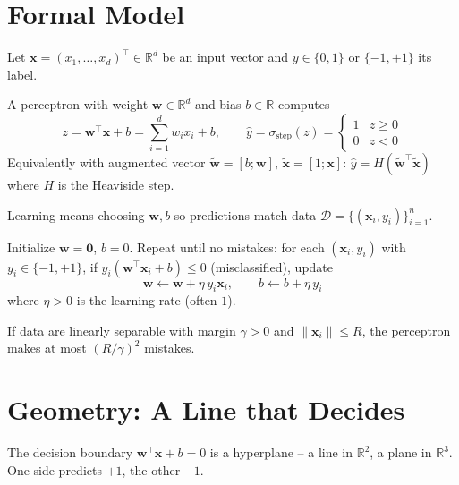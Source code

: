 \section{Formal Model}
Let $\mathbf{x}=(x_1,\dots,x_d)^{\top}\in\mathbb{R}^d$ be an input vector and $y\in\{0,1\}$ or $\{-1,+1\}$ its label.

\begin{definition}
A perceptron with weight $\mathbf{w}\in\mathbb{R}^d$ and bias $b\in\mathbb{R}$ computes
\begin{equation}
z = \mathbf{w}^{\top}\mathbf{x}+b = \sum_{i=1}^{d} w_i x_i + b, \qquad
\hat{y}= \sigma_{\text{step}}(z)=\begin{cases}1 & z\ge 0\\0 & z<0\end{cases}
\end{equation}
Equivalently with augmented vector $\tilde{\mathbf{w}}=[b;\mathbf{w}]$, $\tilde{\mathbf{x}}=[1;\mathbf{x}]$: $\hat{y}=H(\tilde{\mathbf{w}}^{\top}\tilde{\mathbf{x}})$ where $H$ is the Heaviside step.
\end{definition}

Learning means choosing $\mathbf{w},b$ so predictions match data $\mathcal{D}=\{(\mathbf{x}_i,y_i)\}_{i=1}^n$.

\begin{definition}
Initialize $\mathbf{w}=\mathbf{0}$, $b=0$. Repeat until no mistakes: for each $(\mathbf{x}_i,y_i)$ with $y_i\in\{-1,+1\}$, if $y_i(\mathbf{w}^{\top}\mathbf{x}_i+b)\le 0$ (misclassified), update
\begin{equation}
\mathbf{w}\leftarrow \mathbf{w}+ \eta\,y_i\mathbf{x}_i,\qquad b\leftarrow b+\eta\,y_i
\end{equation}
where $\eta>0$ is the learning rate (often $1$).
\end{definition}

\begin{theorem}
If data are linearly separable with margin $\gamma>0$ and $\|\mathbf{x}_i\|\le R$, the perceptron makes at most $(R/\gamma)^2$ mistakes.
\end{theorem}

\section{Geometry: A Line that Decides}
The decision boundary $\mathbf{w}^{\top}\mathbf{x}+b=0$ is a hyperplane -- a line in $\mathbb{R}^2$, a plane in $\mathbb{R}^3$. One side predicts $+1$, the other $-1$.

